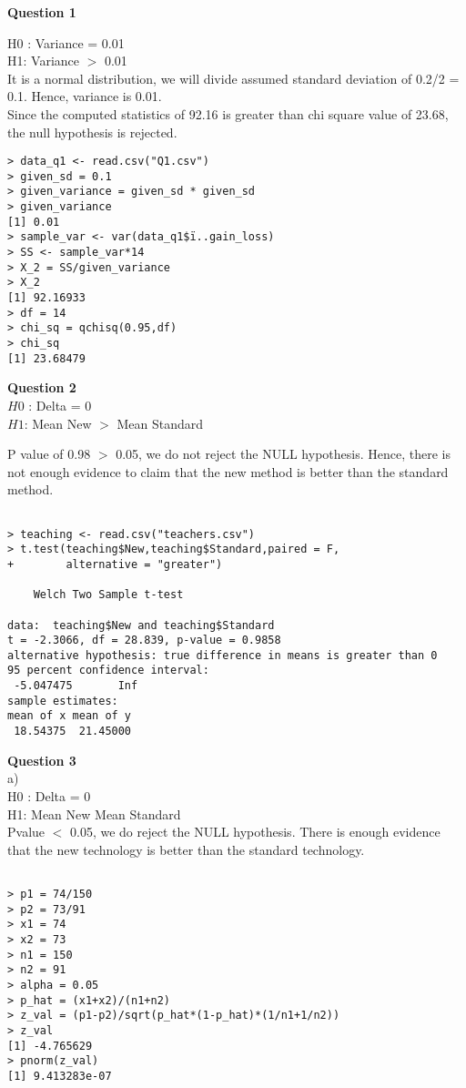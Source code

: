 \documentclass[12pt,letterpaper]{article}
\begin{document}
{\Large {\textbf{Question 1}}}

H0 : Variance = 0.01\\
H1: Variance $>$ 0.01\\
It is a normal distribution, we will divide assumed standard deviation of 0.2/2 = 0.1. Hence, variance is 0.01.\\

Since the computed statistics of 92.16  is greater than
chi square value of 23.68, the null hypothesis is 
rejected.

\begin{lstlisting}[label=R Code,caption=Q1 R Code Output]
> data_q1 <- read.csv("Q1.csv")
> given_sd = 0.1
> given_variance = given_sd * given_sd
> given_variance
[1] 0.01
> sample_var <- var(data_q1$ï..gain_loss)
> SS <- sample_var*14
> X_2 = SS/given_variance
> X_2
[1] 92.16933
> df = 14
> chi_sq = qchisq(0.95,df)
> chi_sq
[1] 23.68479
\end{lstlisting}
{\Large {\textbf{Question 2}}}\\

$H0$ : Delta  =  0\\
$H1$: Mean New $>$ Mean Standard 

P value of 0.98  $>$  0.05,  we do not reject the NULL 
hypothesis.
Hence, there is not enough evidence to claim that the new method is better than the standard method.

\begin{lstlisting}[label=R Code,caption=Q2 R Code Output]
      
> teaching <- read.csv("teachers.csv")
> t.test(teaching$New,teaching$Standard,paired = F,
+        alternative = "greater")

	Welch Two Sample t-test

data:  teaching$New and teaching$Standard
t = -2.3066, df = 28.839, p-value = 0.9858
alternative hypothesis: true difference in means is greater than 0
95 percent confidence interval:
 -5.047475       Inf
sample estimates:
mean of x mean of y 
 18.54375  21.45000 
\end{lstlisting}
{\Large \textbf{Question 3}}\\
{a)}\\
H0 : Delta = 0\\
H1: Mean New \neq Mean Standard \\

Pvalue $<$ 0.05, we do reject the NULL hypothesis. There is enough evidence that the new technology is better than the standard technology.\\
\begin{lstlisting}[label=R Code,caption=Q3(a) R Code Output]
      
> p1 = 74/150
> p2 = 73/91
> x1 = 74
> x2 = 73
> n1 = 150
> n2 = 91
> alpha = 0.05
> p_hat = (x1+x2)/(n1+n2)
> z_val = (p1-p2)/sqrt(p_hat*(1-p_hat)*(1/n1+1/n2))
> z_val
[1] -4.765629
> pnorm(z_val)
[1] 9.413283e-07
\end{lstlisting}
\end{document}
